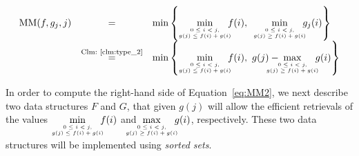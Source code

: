 \begin{equation}
\label{eq:MM2} 
	\begin{array}{rcl}
		\text{MM}(f, g_j, j) & = & \min\left\{
			\hspace{-.5em}\min\limits_{{\tiny\begin{array}{c}
				0 \leq i < j, \\
				g(j) \leq f(i) + g(i)
			\end{array}}} \hspace{-1em} f(i),
			\min\limits_{{\tiny \begin{array}{c}
				0 \leq i < j, \\
				g(j) \geq f(i) + g(i)
			\end{array}}} \hspace{-1em} g_j(i)
		\right\} \\
		& \stackrel{\text{Clm:~\ref{clm:type_2}}}{=} & \min\left\{
			\hspace{-.5em}\min\limits_{{\tiny \begin{array}{c}
				0 \leq i < j, \\
				g(j) \leq f(i) + g(i)
				\end{array}}} \hspace{-1em} f(i), \ 
			g(j) - \hspace{-2em}\max\limits_{{\tiny\begin{array}{c}
				0 \leq i < j, \\
				g(j) \geq f(i) + g(i)
				\end{array}}} \hspace{-1em} g(i)
		\right\}
	\end{array}
\end{equation}

In order to compute the right-hand side of Equation~\ref{eq:MM2}, we next describe two data structures $F$ and $G$, that given $g(j)$ will allow the efficient retrievals of the values 
$\hspace{-.5em}\min\limits_{{\tiny \begin{array}{c}
	0 \leq i < j, \\
	g(j) \leq f(i) + g(i)
	\end{array}}} \hspace{-1em} f(i)$ and
$\hspace{-2em}\max\limits_{{\tiny\begin{array}{c}
		0 \leq i < j, \\
		g(j) \geq f(i) + g(i)
		\end{array}}} \hspace{-1em} g(i)$, respectively.
These two data structures will be implemented using \emph{sorted sets}.

